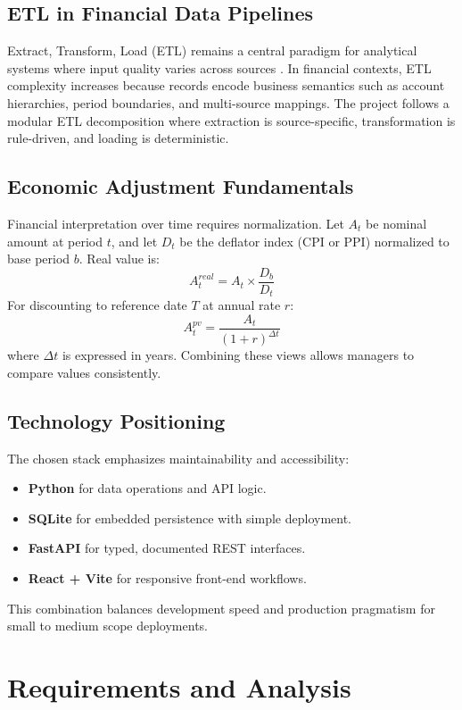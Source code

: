 \documentclass[12pt,a4paper]{report}
\begin{document}
\section{ETL in Financial Data Pipelines}
Extract, Transform, Load (ETL) remains a central paradigm for analytical systems where input quality varies across sources \citep{kimball}. In financial contexts, ETL complexity increases because records encode business semantics such as account hierarchies, period boundaries, and multi-source mappings. The project follows a modular ETL decomposition where extraction is source-specific, transformation is rule-driven, and loading is deterministic.

\section{Economic Adjustment Fundamentals}
Financial interpretation over time requires normalization. Let $A_t$ be nominal amount at period $t$, and let $D_t$ be the deflator index (CPI or PPI) normalized to base period $b$. Real value is:
\begin{equation}
  A^{real}_t = A_t \times \frac{D_b}{D_t}
\end{equation}
For discounting to reference date $T$ at annual rate $r$:
\begin{equation}
  A^{pv}_t = \frac{A_t}{(1+r)^{\Delta t}}
\end{equation}
where $\Delta t$ is expressed in years. Combining these views allows managers to compare values consistently.

\section{Technology Positioning}
The chosen stack emphasizes maintainability and accessibility:
\begin{itemize}[leftmargin=1.5em]
  \item \textbf{Python} for data operations and API logic.
  \item \textbf{SQLite} for embedded persistence with simple deployment.
  \item \textbf{FastAPI} for typed, documented REST interfaces.
  \item \textbf{React + Vite} for responsive front-end workflows.
\end{itemize}
This combination balances development speed and production pragmatism for small to medium scope deployments.

\chapter{Requirements and Analysis}
\end{document}
